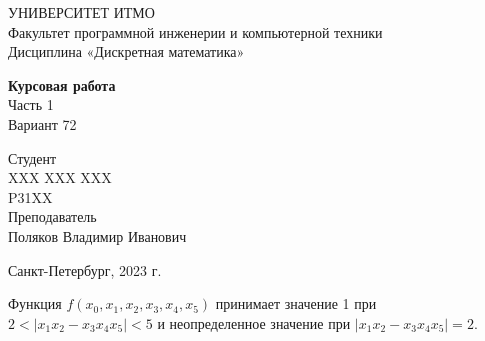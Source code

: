 \documentclass{article}
\begin{document}
\begin{center}
    УНИВЕРСИТЕТ ИТМО \\
    Факультет программной инженерии и компьютерной техники \\
    Дисциплина «Дискретная математика»
    
    \vspace{5cm}

    \large
    \textbf{Курсовая работа} \\
    Часть 1 \\
    Вариант 72
\end{center}

\vspace{2cm}

\hfill\begin{minipage}{0.35\linewidth}
Студент \\
XXX XXX XXX \\
P31XX \\

Преподаватель \\
Поляков Владимир Иванович
\end{minipage}

\vfill

\begin{center}
    Санкт-Петербург, 2023 г.
\end{center}

\thispagestyle{empty}
\newpage

Функция $f(x_0,x_1,x_2,x_3,x_4,x_5)$ принимает значение 1 при $2 < |x_1 x_2 - x_3 x_4 x_5| < 5$ и неопределенное значение при $|x_1 x_2 - x_3 x_4 x_5| = 2$.
\end{document}
